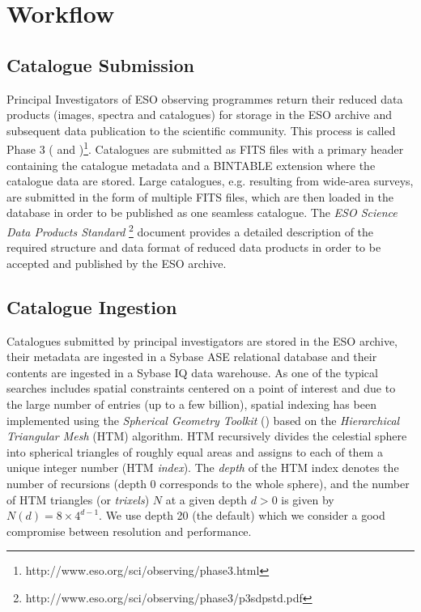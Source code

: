 \section{Workflow}
\subsection{Catalogue Submission}
Principal Investigators of ESO observing programmes return their reduced data products (images, spectra and catalogues) for storage in the ESO archive and subsequent data
publication to the scientific community. This process is called Phase 3 (\citet{phase3} and \citet{messenger})\footnote{http://www.eso.org/sci/observing/phase3.html}.
Catalogues are submitted as FITS files with a primary header containing the catalogue metadata and a BINTABLE extension where the catalogue data are stored. Large catalogues, e.g.
resulting from wide-area surveys, are submitted in the form of multiple FITS files, which are then loaded in the database in order to be published as one seamless catalogue.
The \textit{ESO Science Data Products Standard} \footnote{http://www.eso.org/sci/observing/phase3/p3sdpstd.pdf}
document provides a detailed description of the required structure and data format of reduced data products in order to be accepted and published
by the ESO archive.

\subsection{Catalogue Ingestion}
Catalogues submitted by principal investigators are stored in the ESO archive, their metadata are ingested in a Sybase ASE relational database and their contents are ingested in a Sybase IQ data warehouse. As one of the typical searches includes spatial constraints centered on a point of interest and due to the large number of entries (up to a few billion), spatial indexing has been implemented using the \textit{Spherical Geometry Toolkit} (\citet{spherical})
based on the \textit{Hierarchical Triangular Mesh} (HTM) algorithm. HTM recursively divides the celestial sphere into spherical triangles of roughly equal areas and assigns to each of them a unique integer number (HTM \textit{index}). The \textit{depth} of the HTM index denotes the number of recursions (depth 0 corresponds to the whole sphere), and the number of HTM triangles (or \textit{trixels}) $N$ at a given depth $d>0$ is given by $N(d) = 8\times{4^{d-1}}$. We use depth 20 (the default) which we consider a good compromise between resolution and performance.

